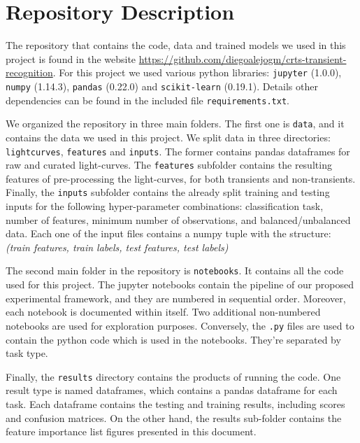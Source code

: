 \documentclass[a4paper,fleqn,usenatbib]{mnras}
\begin{document}

\appendix
\section{Repository Description} \label{section_code}

The repository that contains the code, data and trained models we used in this project is found in the website \url{https://github.com/diegoalejogm/crts-transient-recognition}. For this project we used various python libraries: \texttt{jupyter} (1.0.0), \texttt{numpy} (1.14.3), \texttt{pandas} (0.22.0) and \texttt{scikit-learn} (0.19.1). Details other dependencies can be found in the included file \texttt{requirements.txt}.

We organized the repository in three main folders. The first one is \texttt{data}, and it contains the data we used in this project. We split data in three directories: \texttt{lightcurves}, \texttt{features} and \texttt{inputs}. The former contains pandas dataframes for raw and curated light-curves. The \texttt{features} subfolder contains the resulting features of pre-processing the light-curves, for both transients and non-transients. Finally, the \texttt{inputs} subfolder contains the already split training and testing inputs for the following hyper-parameter combinations: classification task, number of features, minimum number of observations, and balanced/unbalanced data. Each one of the input files contains a numpy tuple with the structure: \textit{(train features, train labels, test features, test labels)}

The second main folder in the repository is \texttt{notebooks}. It contains all the code used for this project. The jupyter notebooks contain the pipeline of our proposed experimental framework, and they are numbered in sequential order. Moreover, each notebook is documented within itself. Two additional non-numbered notebooks are used for exploration purposes. Conversely, the \texttt{.py} files are used to contain the python code which is used in the notebooks. They're separated by task type.

Finally, the \texttt{results} directory contains the products of running the code. One result type is named dataframes, which contains a pandas dataframe for each task. Each dataframe contains the testing and training results, including scores and confusion matrices.  On the other hand, the results sub-folder contains the feature importance list figures presented in this document.
\end{document}

